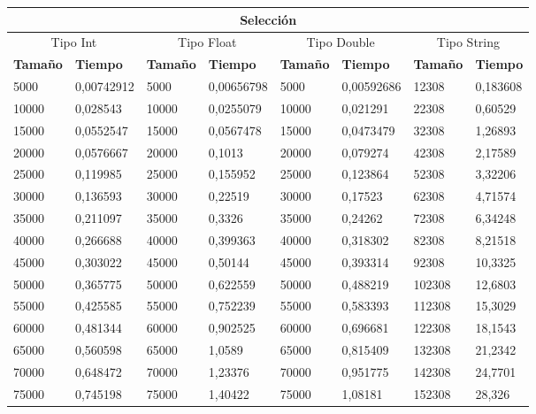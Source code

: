 \documentclass[11pt,openany]{book}
\begin{document}
\begin{table}[!ht]
    \centering
    \small
    \begin{tabular}{|l|l|l|l|l|l|l|l|}
    \hline
    \multicolumn{8}{|c|}{\cellcolor{blue!20}\textbf{Selección}} \\ \hline
    \multicolumn{2}{|c|}{\cellcolor{gray!20}Tipo Int} & \multicolumn{2}{c|}{\cellcolor{gray!20}Tipo Float} & \multicolumn{2}{c|}{\cellcolor{gray!20}Tipo Double} & \multicolumn{2}{c|}{\cellcolor{gray!20}Tipo String}\\ \hline
        \textbf{Tamaño} & \textbf{Tiempo} & \textbf{Tamaño} & \textbf{Tiempo} & \textbf{Tamaño} & \textbf{Tiempo} & \textbf{Tamaño} & \textbf{Tiempo} \\ \hline
        5000 & 0,00742912 & 5000 & 0,00656798 & 5000 & 0,00592686 & 12308 & 0,183608 \\ \hline
        10000 & 0,028543 & 10000 & 0,0255079 & 10000 & 0,021291 & 22308 & 0,60529 \\ \hline
        15000 & 0,0552547 & 15000 & 0,0567478 & 15000 & 0,0473479 & 32308 & 1,26893 \\ \hline
        20000 & 0,0576667 & 20000 & 0,1013 & 20000 & 0,079274 & 42308 & 2,17589 \\ \hline
        25000 & 0,119985 & 25000 & 0,155952 & 25000 & 0,123864 & 52308 & 3,32206 \\ \hline
        30000 & 0,136593 & 30000 & 0,22519 & 30000 & 0,17523 & 62308 & 4,71574 \\ \hline
        35000 & 0,211097 & 35000 & 0,3326 & 35000 & 0,24262 & 72308 & 6,34248 \\ \hline
        40000 & 0,266688 & 40000 & 0,399363 & 40000 & 0,318302 & 82308 & 8,21518 \\ \hline
        45000 & 0,303022 & 45000 & 0,50144 & 45000 & 0,393314 & 92308 & 10,3325 \\ \hline
        50000 & 0,365775 & 50000 & 0,622559 & 50000 & 0,488219 & 102308 & 12,6803 \\ \hline
        55000 & 0,425585 & 55000 & 0,752239 & 55000 & 0,583393 & 112308 & 15,3029 \\ \hline
        60000 & 0,481344 & 60000 & 0,902525 & 60000 & 0,696681 & 122308 & 18,1543 \\ \hline
        65000 & 0,560598 & 65000 & 1,0589 & 65000 & 0,815409 & 132308 & 21,2342 \\ \hline
        70000 & 0,648472 & 70000 & 1,23376 & 70000 & 0,951775 & 142308 & 24,7701 \\ \hline
        75000 & 0,745198 & 75000 & 1,40422 & 75000 & 1,08181 & 152308 & 28,326 \\ \hline

\end{tabular}
\end{table}
\end{document}
